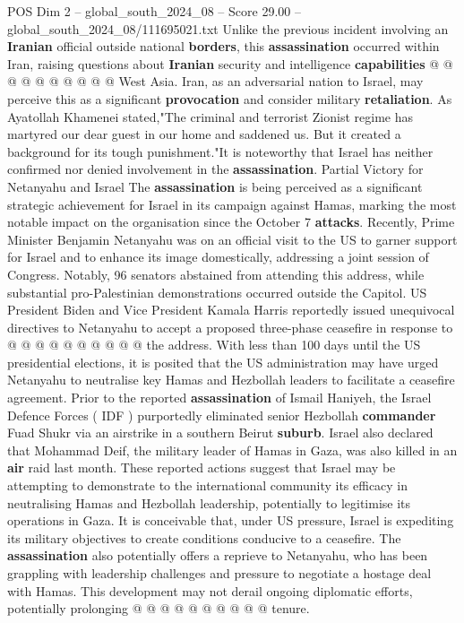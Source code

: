 \begin{textsample}{POS Dim 2 – global\_south\_2024\_08 – Score 29.00 – global\_south\_2024\_08/111695021.txt}
Unlike the previous incident involving an \textbf{Iranian} official outside national \textbf{borders}, this \textbf{assassination} occurred within Iran, raising questions about \textbf{Iranian} security and intelligence \textbf{capabilities} @ @ @ @ @ @ @ @ @ @ West Asia.
Iran, as an adversarial nation to Israel, may perceive this as a significant \textbf{provocation} and consider military \textbf{retaliation}.
As Ayatollah Khamenei stated,"The criminal and terrorist Zionist regime has martyred our dear guest in our home and saddened us.
But it created a background for its tough punishment."It is noteworthy that Israel has neither confirmed nor denied involvement in the \textbf{assassination}.
Partial Victory for Netanyahu and Israel The \textbf{assassination} is being perceived as a significant strategic achievement for Israel in its campaign against Hamas, marking the most notable impact on the organisation since the October 7 \textbf{attacks}.
Recently, Prime Minister Benjamin Netanyahu was on an official visit to the US to garner support for Israel and to enhance its image domestically, addressing a joint session of Congress.
Notably, 96 senators abstained from attending this address, while substantial pro-Palestinian demonstrations occurred outside the Capitol.
US President Biden and Vice President Kamala Harris reportedly issued unequivocal directives to Netanyahu to accept a proposed three-phase ceasefire in response to @ @ @ @ @ @ @ @ @ @ the address.
With less than 100 days until the US presidential elections, it is posited that the US administration may have urged Netanyahu to neutralise key Hamas and Hezbollah leaders to facilitate a ceasefire agreement.
Prior to the reported \textbf{assassination} of Ismail Haniyeh, the Israel Defence Forces ( IDF ) purportedly eliminated senior Hezbollah \textbf{commander} Fuad Shukr via an airstrike in a southern Beirut \textbf{suburb}.
Israel also declared that Mohammad Deif, the military leader of Hamas in Gaza, was also killed in an \textbf{air} raid last month.
These reported actions suggest that Israel may be attempting to demonstrate to the international community its efficacy in neutralising Hamas and Hezbollah leadership, potentially to legitimise its operations in Gaza.
It is conceivable that, under US pressure, Israel is expediting its military objectives to create conditions conducive to a ceasefire.
The \textbf{assassination} also potentially offers a reprieve to Netanyahu, who has been grappling with leadership challenges and pressure to negotiate a hostage deal with Hamas.
This development may not derail ongoing diplomatic efforts, potentially prolonging @ @ @ @ @ @ @ @ @ @ tenure.

\end{textsample}
